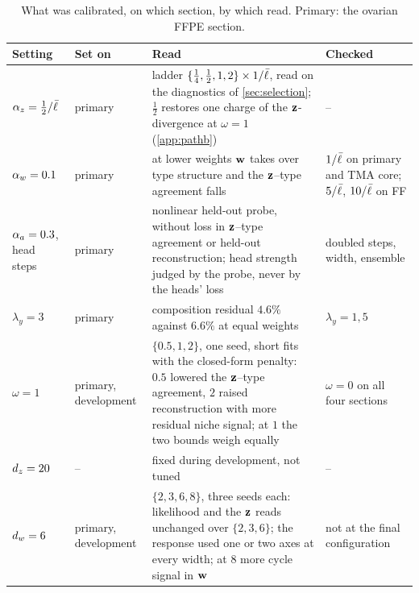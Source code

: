 \begin{table}[!htbp]
\centering
\caption{What was calibrated, on which section, by which read. Primary: the ovarian FFPE section.}
\label{tab:S-calibration}
\footnotesize
\begin{tabular}{@{}p{}p{}p{}p{}@{}}
\toprule
Setting & Set on & Read & Checked \\
\midrule
$\alpha_z = \tfrac12/\bar{\ell}$ & primary & ladder $\{\tfrac14, \tfrac12, 1, 2\}\times 1/\bar{\ell}$, read on the diagnostics of \cref{sec:selection}; $\tfrac12$ restores one charge of the $\mathbf{z}$-divergence at $\omega = 1$ (\cref{app:pathb}) & -- \\
$\alpha_w = 0.1$ & primary & at lower weights $\mathbf{w}$ takes over type structure and the $\mathbf{z}$--type agreement falls & $1/\bar{\ell}$ on primary and TMA core; $5/\bar{\ell}$, $10/\bar{\ell}$ on FF \\
$\alpha_a = 0.3$, head steps & primary & nonlinear held-out probe, without loss in $\mathbf{z}$--type agreement or held-out reconstruction; head strength judged by the probe, never by the heads' loss \citep{elazar2018} & doubled steps, width, ensemble \\
$\lambda_y = 3$ & primary & composition residual $4.6\%$ against $6.6\%$ at equal weights & $\lambda_y = 1, 5$ \\
$\omega = 1$ & primary, development & $\{0.5, 1, 2\}$, one seed, short fits with the closed-form penalty: $0.5$ lowered the $\mathbf{z}$--type agreement, $2$ raised reconstruction with more residual niche signal; at $1$ the two bounds weigh equally & $\omega = 0$ on all four sections \\
$d_z = 20$ & -- & fixed during development, not tuned & -- \\
$d_w = 6$ & primary, development & $\{2, 3, 6, 8\}$, three seeds each: likelihood and the $\mathbf{z}$ reads unchanged over $\{2, 3, 6\}$; the response used one or two axes at every width; at $8$ more cycle signal in $\mathbf{w}$ & not at the final configuration \\
\bottomrule
\end{tabular}
\end{table}




